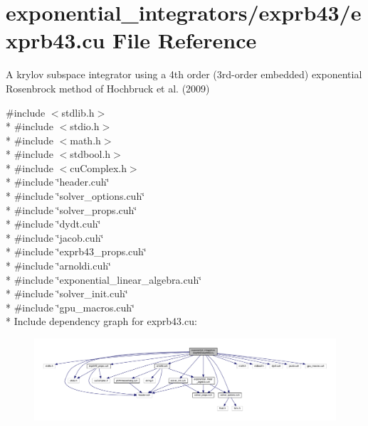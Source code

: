 \hypertarget{exprb43_8cu}{}\section{exponential\+\_\+integrators/exprb43/exprb43.cu File Reference}
\label{exprb43_8cu}


A krylov subspace integrator using a 4th order (3rd-\/order embedded) exponential Rosenbrock method of Hochbruck et al. (2009)  


{\ttfamily \#include $<$stdlib.\+h$>$}\\*
{\ttfamily \#include $<$stdio.\+h$>$}\\*
{\ttfamily \#include $<$math.\+h$>$}\\*
{\ttfamily \#include $<$stdbool.\+h$>$}\\*
{\ttfamily \#include $<$cu\+Complex.\+h$>$}\\*
{\ttfamily \#include \char`\"{}header.\+cuh\char`\"{}}\\*
{\ttfamily \#include \char`\"{}solver\+\_\+options.\+cuh\char`\"{}}\\*
{\ttfamily \#include \char`\"{}solver\+\_\+props.\+cuh\char`\"{}}\\*
{\ttfamily \#include \char`\"{}dydt.\+cuh\char`\"{}}\\*
{\ttfamily \#include \char`\"{}jacob.\+cuh\char`\"{}}\\*
{\ttfamily \#include \char`\"{}exprb43\+\_\+props.\+cuh\char`\"{}}\\*
{\ttfamily \#include \char`\"{}arnoldi.\+cuh\char`\"{}}\\*
{\ttfamily \#include \char`\"{}exponential\+\_\+linear\+\_\+algebra.\+cuh\char`\"{}}\\*
{\ttfamily \#include \char`\"{}solver\+\_\+init.\+cuh\char`\"{}}\\*
{\ttfamily \#include \char`\"{}gpu\+\_\+macros.\+cuh\char`\"{}}\\*
Include dependency graph for exprb43.\+cu\+:\nopagebreak
\begin{figure}[H]
\begin{center}
\leavevmode
\includegraphics[width=350pt]{exprb43_8cu__incl}
\end{center}
\end{figure}
